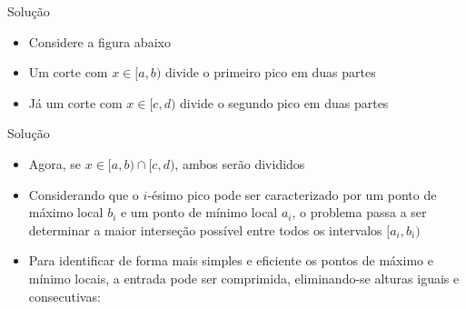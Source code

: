 \begin{frame}[fragile]{Solução}

    \begin{itemize}
        \item Considere a figura abaixo

        

        \item Um corte com $x\in [a, b)$ divide o primeiro pico em duas partes

        \item Já um corte com $x \in [c, d)$ divide o segundo pico em duas partes

    \end{itemize}

\end{frame}


\begin{frame}[fragile]{Solução}

    \begin{itemize}
        \item Agora, se $x\in [a, b)\cap [c, d)$, ambos serão divididos

        \item Considerando que o $i$-ésimo pico pode ser caracterizado por um ponto de máximo local
            $b_i$ e um ponto de mínimo local $a_i$, o problema passa a ser determinar a maior
            interseção possível entre todos os intervalos $[a_i, b_i)$
            
        \item Para identificar de forma mais simples e eficiente os pontos de máximo e mínimo
            locais, a entrada pode ser comprimida, eliminando-se alturas iguais e consecutivas:

            \vspace{0.1in}

    \end{itemize}

\end{frame}

